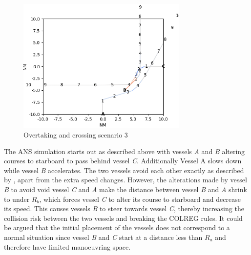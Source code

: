 \begin{figure}[H]
    \centering
    \includegraphics[width=0.75\textwidth,height=0.75\textheight,keepaspectratio]{../src/img/overtaking_crossing_2_res.png}
    \caption{Overtaking and crossing scenario 3}
    \label{fig:overtaking-and-crossing-2-res}
\end{figure}

The ANS simulation starts out as described above with vessels \textit{A} and \textit{B} altering courses to starboard to pass behind vessel \textit{C}. Additionally Vessel A slows down while vessel \textit{B} accelerates. The two vessels avoid each other exactly as described by \textcite{ecolreg_overtaking-and-crossing-2}, apart from the extra speed changes. However, the alterations made by vessel \textit{B} to avoid void vessel \textit{C} and \textit{A} make the distance between vessel \textit{B} and \textit{A} shrink to under $R_b$, which forces vessel \textit{C} to alter its course to starboard and decrease its speed. This causes vessels \textit{B} to steer towards vessel \textit{C}, thereby increasing the collision risk between the two vessels and breaking the COLREG rules. It could be argued that the initial placement of the vessels does not correspond to a normal situation since vessel \textit{B} and \textit{C} start at a distance less than $R_a$ and therefore have limited manoeuvring space.


